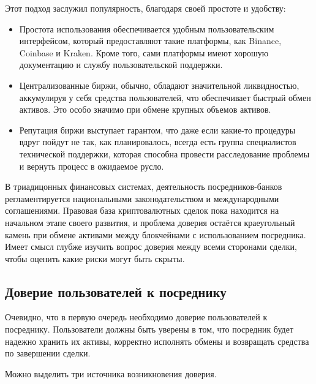 Этот подход заслужил популярность, благодаря своей простоте и удобству:
\begin{itemize}
\item Простота использования обеспечивается удобным пользовательским интерфейсом, который предоставляют такие платформы, как Binance, Coinbase и Kraken. Кроме того, сами платформы имеют хорошую документацию и службу пользовательской поддержки.

\item Централизованные биржи, обычно, обладают значительной ликвидностью, аккумулируя у себя средства пользователей, что обеспечивает быстрый обмен активов. Это особо значимо при обмене крупных объемов активов.

\item Репутация биржи выступает гарантом, что даже если какие-то процедуры вдруг пойдут не так, как планировалось, всегда есть группа специалистов технической поддержки, которая способна провести расследование проблемы и вернуть процесс в ожидаемое русло.
\end{itemize}

В триадицонных финансовых системах, деятельность посредников-банков регламентируется национальными законодательством и международными соглашениями. Правовая база криптовалютных сделок пока находится на начальном этапе своего развития, и проблема доверия остаётся краеугольный камень при обмене активами между блокчейнами с использованием посредника. Имеет смысл глубже изучить вопрос доверия между всеми сторонами сделки, чтобы оценить какие риски могут быть скрыты.

\subsection{Доверие пользователей к посреднику}

Очевидно, что в первую очередь необходимо доверие пользователей к посреднику. Пользователи должны быть уверены в том, что посредник будет надежно хранить их активы, корректно исполнять обмены и возвращать средства по завершении сделки.

Можно выделить три источника возникновения доверия.


